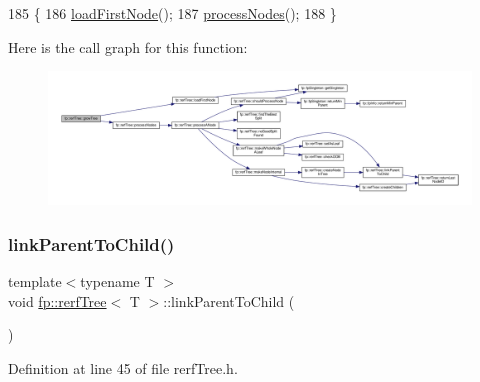 \begin{DoxyCode}
185                                \{
186                     \hyperlink{classfp_1_1rerfTree_a00b09f0d455acaae7ae2d11db5d82478}{loadFirstNode}();
187                     \hyperlink{classfp_1_1rerfTree_aa8281a45487868e4cf8e3dad9d9be8d3}{processNodes}();
188                 \}
\end{DoxyCode}
Here is the call graph for this function\+:
\nopagebreak
\begin{figure}[H]
\begin{center}
\leavevmode
\includegraphics[width=350pt]{classfp_1_1rerfTree_ae352b72e40a7f16c0042a0ff10564b6b_cgraph}
\end{center}
\end{figure}
\mbox{\label{classfp_1_1rerfTree_a7750b048cb8beaada5279f3a702f6cc2}} 
\subsubsection{\texorpdfstring{link\+Parent\+To\+Child()}{linkParentToChild()}}
{\footnotesize\ttfamily template$<$typename T $>$ \\
void \hyperlink{classfp_1_1rerfTree}{fp\+::rerf\+Tree}$<$ T $>$\+::link\+Parent\+To\+Child (\begin{DoxyParamCaption}{ }\end{DoxyParamCaption})\hspace{0.3cm}{\ttfamily [inline]}}



Definition at line 45 of file rerf\+Tree.\+h.



